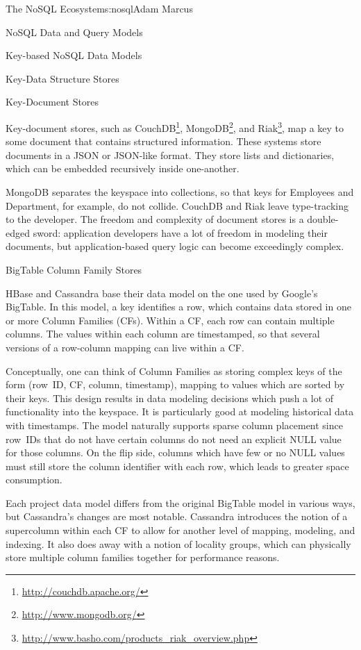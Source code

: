 \begin{aosachapter}{The NoSQL Ecosystem}{s:nosql}{Adam Marcus}
\begin{aosasect1}{NoSQL Data and Query Models}
\begin{aosasect2}{Key-based NoSQL Data Models}
\begin{aosasect3}{Key-Data Structure Stores}
\end{aosasect3}

\begin{aosasect3}{Key-Document Stores}

Key-document stores, such as CouchDB\footnote{\url{http://couchdb.apache.org/}}, MongoDB\footnote{\url{http://www.mongodb.org/}}, and Riak\footnote{\url{http://www.basho.com/products_riak_overview.php}}, map a key to
some document that contains structured information.  These systems
store documents in a JSON or JSON-like format.  They store lists and
dictionaries, which can be embedded recursively inside one-another.

MongoDB separates the keyspace into collections, so that keys for
Employees and Department, for example, do not collide.  CouchDB and
Riak leave type-tracking to the developer.  The freedom and complexity
of document stores is a double-edged sword: application developers
have a lot of freedom in modeling their documents, but
application-based query logic can become exceedingly complex.

\end{aosasect3}

\begin{aosasect3}{BigTable Column Family Stores}

HBase and Cassandra base their data model on the one used by Google's
BigTable.  In this model, a key identifies a row, which contains data
stored in one or more Column Families (CFs).  Within a CF, each row
can contain multiple columns.  The values within each column are
timestamped, so that several versions of a row-column mapping can live
within a CF.

Conceptually, one can think of Column Families as storing complex keys
of the form (row~ID, CF, column, timestamp), mapping to values which
are sorted by their keys.  This design results in data modeling
decisions which push a lot of functionality into the keyspace.  It is
particularly good at modeling historical data with timestamps.  The
model naturally supports sparse column placement since row~IDs that do
not have certain columns do not need an explicit NULL value for those
columns.  On the flip side, columns which have few or no NULL values
must still store the column identifier with each row, which leads to
greater space consumption.

Each project data model differs from the original BigTable model in
various ways, but Cassandra's changes are most notable.  Cassandra
introduces the notion of a supercolumn within each CF to allow for
another level of mapping, modeling, and indexing.  It also does away
with a notion of locality groups, which can physically store multiple
column families together for performance reasons.


\end{aosasect3}
\end{aosasect2}
\end{aosasect1}
\end{aosachapter}

